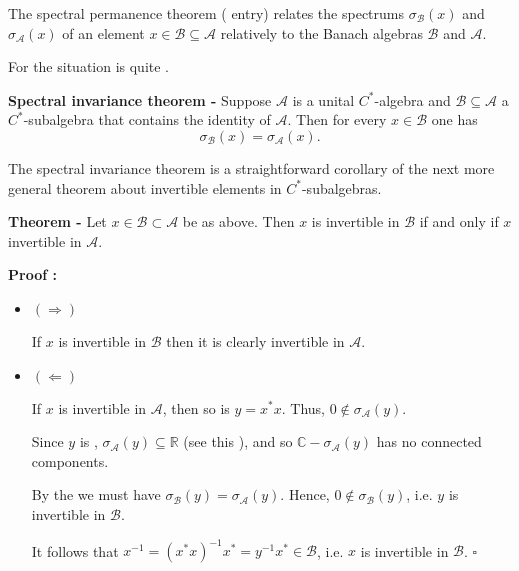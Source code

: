 \documentclass[12pt]{article}
\begin{document}
The spectral permanence theorem ( entry) relates the spectrums $\sigma_{\mathcal{B}}(x)$ and $\sigma_{\mathcal{A}}(x)$ of an element $x \in \mathcal{B} \subseteq \mathcal{A}$ relatively to the Banach algebras $\mathcal{B}$ and $\mathcal{A}$.

For  the situation is quite .

{\bf Spectral invariance theorem -} Suppose $\mathcal{A}$ is a unital $C^*$-algebra and $\mathcal{B} \subseteq \mathcal{A}$ a $C^*$-subalgebra that contains the identity of $\mathcal{A}$. Then for every $x \in \mathcal{B}$ one has
\begin{displaymath}
\sigma_{\mathcal{B}}(x)=\sigma_{\mathcal{A}}(x).
\end{displaymath}

The spectral invariance theorem is a straightforward corollary of the next more general theorem about invertible elements in $C^*$-subalgebras.

{\bf Theorem -} Let $x \in \mathcal{B} \subset \mathcal{A}$ be as above. Then $x$ is invertible in $\mathcal{B}$ if and only if $x$ invertible in $\mathcal{A}$.

{\bf Proof :}
\begin{itemize} 
\item $(\Longrightarrow)$

If $x$ is invertible in $\mathcal{B}$ then it is clearly invertible in $\mathcal{A}$.

\item $(\Longleftarrow)$

If $x$ is invertible in $\mathcal{A}$, then so is $y=x^*x$. Thus, $0 \notin \sigma_{\mathcal{A}}(y)$.

Since $y$ is , $\sigma_{\mathcal{A}}(y) \subseteq \mathbb{R}$ (see this ), and so $\mathbb{C} - \sigma_{\mathcal{A}}(y)$ has no  connected components.

By the  we must have $\sigma_{\mathcal{B}}(y)=\sigma_{\mathcal{A}}(y)$. Hence, $0 \notin \sigma_{\mathcal{B}}(y)$, i.e. $y$ is invertible in $\mathcal{B}$.

It follows that $x^{-1}=(x^*x)^{-1}x^*=y^{-1}x^* \in \mathcal{B}$, i.e. $x$ is invertible in $\mathcal{B}$. $\square$
\end{itemize}

\end{document}
